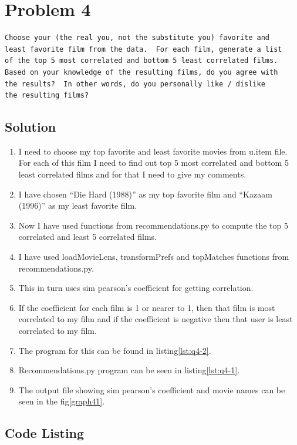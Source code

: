 

\section{Problem 4}
\label{part4}
\begin{verbatim}
Choose your (the real you, not the substitute you) favorite and
least favorite film from the data.  For each film, generate a list
of the top 5 most correlated and bottom 5 least correlated films.
Based on your knowledge of the resulting films, do you agree with
the results?  In other words, do you personally like / dislike
the resulting films?

\end{verbatim}

\subsection{Solution}
\begin{enumerate}
\item I need to choose my top favorite and least favorite movies from u.item file. For each of this film I need to find out top 5 most correlated and bottom 5 least correlated films and for that I need to give my comments.
\item I have chosen ``Die Hard (1988)'' as my top favorite film and ``Kazaam (1996)'' as my least favorite film.
\item Now I have used functions from recommendations.py to compute the top 5 correlated and least 5 correlated films.
\item I have used loadMovieLens, transformPrefs and topMatches functions from recommendations.py.
\item This in turn uses sim pearson's coefficient for getting correlation.
\item If the coefficient for each film is 1 or nearer to 1, then that film is most correlated to my film and if the coefficient is negative then that user is least correlated to my film.
\item The program for this can be found in listing\ref{lst:q4-2}.
\item Recommendations.py program can be seen in listing\ref{lst:q4-1}.
\item The output file showing sim pearson's coefficient and movie names can be seen in the fig\ref{graph41}.
\end{enumerate}
\newpage

\subsection{Code Listing}

